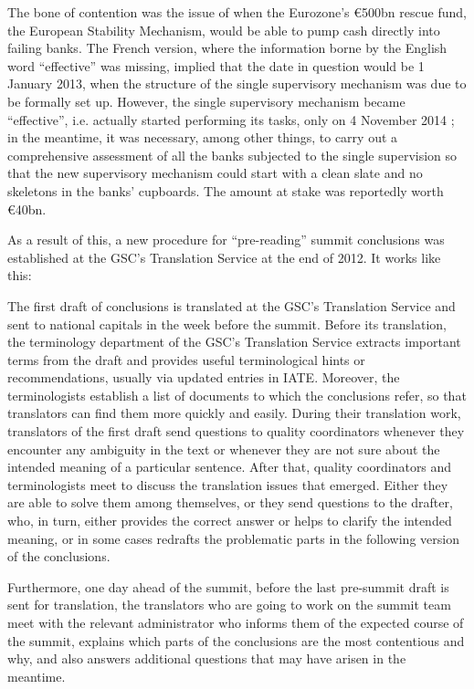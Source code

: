 \documentclass[output=paper]{langsci/langscibook}
\begin{document}
The bone of contention was the issue of when the Eurozone's €500bn rescue fund, the European Stability Mechanism, would be able to pump cash directly into failing banks. The French version, where the information borne by the English word “effective” was missing, implied that the date in question would be 1 January 2013, when the structure of the single supervisory mechanism was due to be formally set up. However, the single supervisory mechanism became “effective”, i.e. actually started performing its tasks, only on 4 November 2014 \citep{ECB2014}; in the meantime, it was necessary, among other things, to carry out a comprehensive assessment of all the banks subjected to the single supervision so that the new supervisory mechanism could start with a clean slate and no skeletons in the banks’ cupboards. The amount at stake was reportedly worth €40bn.

As a result of this, a new procedure for “pre-reading” summit conclusions was established at the GSC's Translation Service at the end of 2012. It works like this:

The first draft of conclusions is translated at the GSC's Translation Service and sent to national capitals in the week before the summit. Before its translation, the terminology department of the GSC's Translation Service extracts important terms from the draft and provides useful terminological hints or recommendations, usually via updated entries in IATE. Moreover, the terminologists establish a list of documents to which the conclusions refer, so that translators can find them more quickly and easily. During their translation work, translators of the first draft send questions to quality coordinators whenever they encounter any ambiguity in the text or whenever they are not sure about the intended meaning of a particular sentence. After that, quality coordinators and terminologists meet to discuss the translation issues that emerged. Either they are able to solve them among themselves, or they send questions to the drafter, who, in turn, either provides the correct answer or helps to clarify the intended meaning, or in some cases redrafts the problematic parts in the following version of the conclusions.

Furthermore, one day ahead of the summit, before the last pre-summit draft is sent for translation, the translators who are going to work on the summit team meet with the relevant administrator who informs them of the expected course of the summit, explains which parts of the conclusions are the most contentious and why, and also answers additional questions that may have arisen in the meantime.
\end{document}

